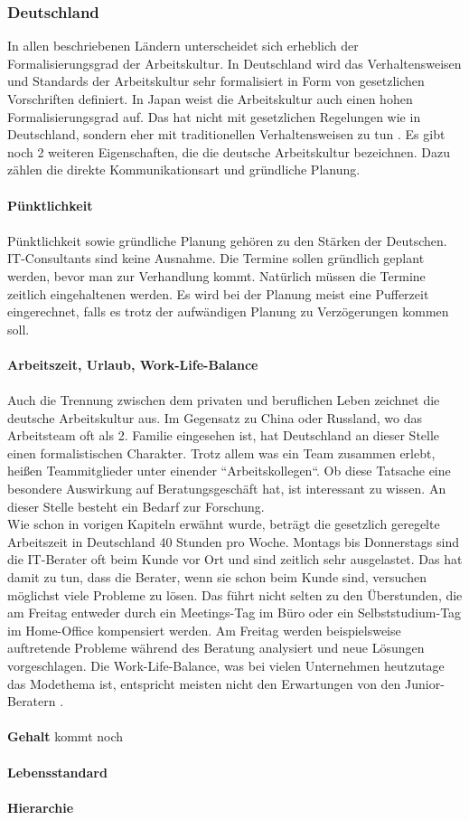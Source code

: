 	\subsubsection{Deutschland}
	In allen beschriebenen Ländern unterscheidet sich erheblich der Formalisierungsgrad der Arbeitskultur. In Deutschland wird das Verhaltensweisen und Standards der Arbeitskultur sehr formalisiert in Form von gesetzlichen Vorschriften definiert. In Japan weist die Arbeitskultur auch einen hohen Formalisierungsgrad auf. Das hat nicht mit gesetzlichen Regelungen wie in Deutschland, sondern eher mit traditionellen Verhaltensweisen zu tun \cite[236]{3LaenderVergl}. Es gibt noch 2 weiteren Eigenschaften, die die deutsche Arbeitskultur bezeichnen. Dazu zählen die direkte Kommunikationsart und gründliche Planung.\\ \\
	\textbf{Pünktlichkeit}\\ \\
	Pünktlichkeit sowie gründliche Planung gehören zu den Stärken der Deutschen. IT-Consultants sind keine Ausnahme. Die Termine sollen gründlich geplant werden, bevor man zur Verhandlung kommt. Natürlich müssen die Termine zeitlich eingehaltenen werden. Es wird bei der Planung meist eine Pufferzeit eingerechnet, falls es trotz der aufwändigen Planung zu Verzögerungen kommen soll.\\ \\
	\textbf{Arbeitszeit, Urlaub, Work-Life-Balance 
	} \\ \\
	Auch die  Trennung zwischen dem privaten und beruflichen Leben zeichnet die  deutsche Arbeitskultur aus. Im Gegensatz zu China oder Russland, wo das Arbeitsteam oft als 2. Familie eingesehen ist, hat Deutschland an dieser Stelle einen formalistischen Charakter. Trotz allem was ein Team zusammen erlebt, heißen Teammitglieder unter einender ``Arbeitskollegen``. Ob diese Tatsache eine besondere Auswirkung auf Beratungsgeschäft hat, ist interessant zu wissen. An dieser Stelle besteht ein Bedarf zur Forschung.\\
	Wie schon in vorigen Kapiteln erwähnt wurde, beträgt die gesetzlich geregelte Arbeitszeit in Deutschland 40 Stunden pro Woche. Montags bis Donnerstags sind die IT-Berater oft beim Kunde vor Ort und sind zeitlich sehr ausgelastet. Das hat damit zu tun, dass die Berater, wenn sie schon beim Kunde sind, versuchen möglichst viele Probleme zu lösen. Das führt nicht selten zu den Überstunden, die am Freitag entweder durch ein Meetings-Tag im Büro oder ein Selbststudium-Tag im Home-Office kompensiert werden. Am Freitag werden beispielsweise auftretende Probleme während des Beratung analysiert und neue Lösungen vorgeschlagen. Die Work-Life-Balance, was bei vielen Unternehmen heutzutage das Modethema ist, entspricht meisten nicht den Erwartungen von den Junior-Beratern \cite{JNRBer}.\\ \\
	\textbf{Gehalt} kommt noch \\ \\
	\textbf{Lebensstandard} \\ \\
	\textbf{Hierarchie}
	
